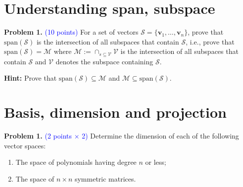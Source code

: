 \documentclass[english,onecolumn]{IEEEtran}
\begin{document}
\newpage
\section{Understanding span, subspace}
\noindent\textbf{Problem 1.}  \textcolor{blue}{(10 points)} 
For a set of vectors $\mathcal{S} = \{ \mathbf{v}_1, \ldots, \mathbf{v}_n\}$, prove that $\text{span}(\mathcal{S})$ is the intersection of all subspaces that contain $\mathcal{S}$, i.e.,
prove that $\text{span}(\mathcal{S})=\mathcal{M}$ where $\mathcal{M}:=\cap_{s\subseteq \mathcal{V}} \mathcal{V}$ is the intersection of all subspaces that contain $\mathcal{S}$ and $\mathcal{V}$ denotes the subspace containing $\mathcal{S}$.

\textbf{Hint:} Prove that $\text{span}(\mathcal{S})\subseteq\mathcal{M}$ and $\mathcal{M}\subseteq \text{span}(\mathcal{S})$. 




\newpage

\section{Basis, dimension and projection}
\noindent\textbf{Problem 1.} \textcolor{blue}{(2 points $\times$ 2)} 
Determine the dimension of each of the following vector spaces:
\begin{enumerate}
	\item The space of polynomials having degree $n$ or less;
	\item The space of $n\times n$ symmetric matrices.
\end{enumerate}
\end{document}
